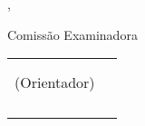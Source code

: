
\makeatletter
\begin{folhadeaprovacao}

	\begin{center}
		{\large\normalfont\scshape\textbf\imprimirautor}
	\end{center}

	\vspace*{50pt}

	\begin{center}
		\ABNTEXchapterfont\Large\scshape\imprimirtitulo
		\abntex@ifnotempty{\imprimirsubtitulo}{
			{\ABNTEXchapterfont\Large\scshape{\hspace*{-0.3em}: }}{\ABNTEXchapterfont\large\scshape\imprimirsubtitulo}
		}
	\end{center}

	\vspace*{30pt}

%

	\begin{center}
		\imprimirlocal, \imprimirdatadefesa
		\end{center}
		
		\vspace*{7pt}
		\begin{center}
		Comissão Examinadora
		\end{center}
\vspace{-2pt}
\begin{center}
\begin{tabular}{cc}
	\assinatura{\textbf{\imprimirorientador} \\ \imprimirinstOrientador \\ (Orientador)}&\\
		\assinatura{\textbf{\imprimirbancamembrointerno} \\ \imprimirbancainstmembrointerno} &\\
		\assinatura{\textbf{\imprimirbancamembroexterno} \\ \imprimirbancainstmembroexterno}&\\


\end{tabular}
\end{center}
\end{folhadeaprovacao}
